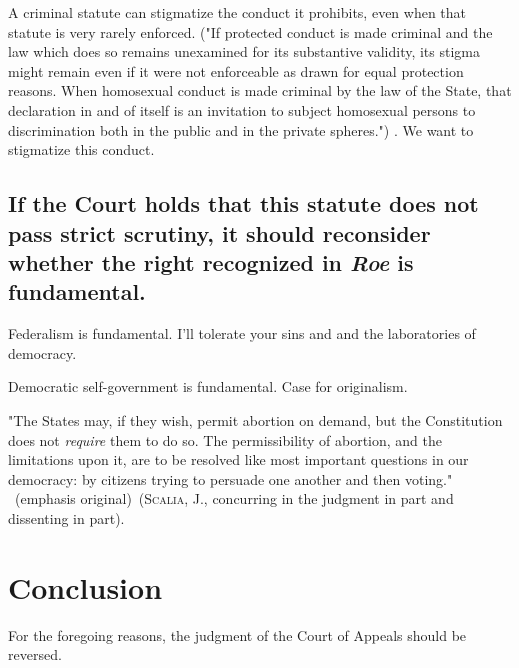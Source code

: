 \documentclass[12pt,\documentclassflag]{SCOTUS_Brief}
\begin{document}
A criminal statute can stigmatize the conduct it prohibits, even when that statute is very rarely enforced. ("If protected conduct is made criminal and the law which does so remains unexamined for its substantive validity, its stigma might remain even if it were not enforceable as drawn for equal protection reasons. When homosexual conduct is made criminal by the law of the State, that declaration in and of itself is an invitation to subject homosexual persons to discrimination both in the public and in the private spheres.") . We want to stigmatize this conduct.

\subsection{If the Court holds that this statute does not pass strict scrutiny, it should reconsider whether the right recognized in \textit{Roe} is fundamental.}

Federalism is fundamental. I'll tolerate your sins and and the laboratories of democracy.

Democratic self-government is fundamental. Case for originalism.

"The States may, if they wish, permit abortion on demand, but the Constitution does not \textit{require} them to do so. The permissibility of abortion, and the limitations upon it, are to be resolved like most important questions in our democracy: by citizens trying to persuade one another and then voting." ~(emphasis original)~(\textsc{Scalia}, J., concurring in the judgment in part and dissenting in part).

\section{Conclusion}

For the foregoing reasons, the judgment of the Court of Appeals should be reversed.


\makeendmatter 
\end{document}
